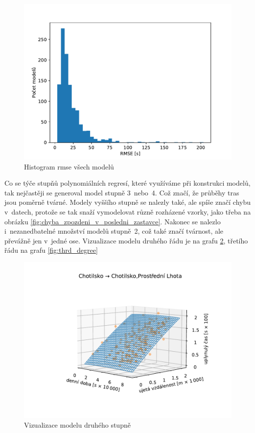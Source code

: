 \begin{figure}
   \centering
 \includegraphics[width=\linewidth]{../img/rmse}
 \caption{Histogram \gls{rmse} všech modelů}
 \label{fig:rmse}
\end{figure}


\bigbreak

Co se týče stupňů polynomiálních regresí, které využíváme při konstrukci modelů, tak nejčastěji se generoval model stupně 3~nebo~4. Což značí, že průběhy tras jsou poměrně tvárné. Modely vyššího stupně se nalezly také, ale spíše značí chybu v~datech, protože se tak snaží vymodelovat různě rozházené vzorky, jako třeba na obrázku \ref{fig:chyba_zpozdeni_v_posledni_zastavce}. Nakonec se nalezlo i~nezanedbatelné množství modelů stupně~2, což také značí tvárnost, ale převážně jen v~jedné ose. Vizualizace modelu druhého řádu je na grafu \ref{fig:second_degree}, třetího řádu na grafu \ref{fig:thrd_degree}


\begin{figure}
   \centering
 \includegraphics[width=\linewidth]{../img/23_24}
 \caption{Vizualizace modelu druhého stupně}
 \label{fig:second_degree}
\end{figure}

